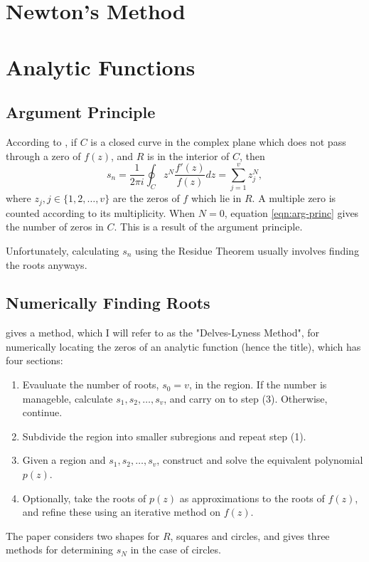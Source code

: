 \documentclass{article}
\begin{document}
\section{Newton's Method}

\section{Analytic Functions}

\subsection{Argument Principle}

According to \cite{delves1967numerical},
if $C$ is a closed curve in the complex plane which does not pass through a zero of $f(z)$, and $R$ is in the interior of $C$, 
then
\begin{equation}\label{eqn:arg-princ}
	s_n=\frac{1}{2\pi i}\oint_Cz^N\frac{f'(z)}{f(z)}dz=\sum_{j=1}^vz_j^N,
\end{equation}
where $z_j,j\in\{1,2,\dots,v\}$ are the zeros of $f$ which lie in $R$.
A multiple zero is counted according to its multiplicity.
When $N=0$, equation \ref{eqn:arg-princ} gives the number of zeros in $C$.
This is a result of the argument principle.\cite{wiki:argument-principle}

Unfortunately, calculating $s_n$ using the Residue Theorem usually involves finding the roots anyways.

\subsection{Numerically Finding Roots}

\cite{delves1967numerical} gives a method, which I will refer to as the "Delves-Lyness Method", for numerically locating the zeros of an analytic function (hence the title),
which has four sections:
\begin{enumerate}
	\item Evauluate the number of roots, $s_0=v$, in the region.
	If the number is manageble, calculate $s_1,s_2,\dots,s_v$, and carry on to step (3).
	Otherwise, continue.
	\item
	Subdivide the region into smaller subregions and repeat step (1).
	\item Given a region and $s_1,s_2,\dots,s_v$, construct and solve the equivalent polynomial $p(z)$.
	\item Optionally, take the roots of $p(z)$ as approximations to the roots of $f(z)$,
	and refine these using an iterative method on $f(z)$.
\end{enumerate}
The paper considers two shapes for $R$, squares and circles, 
and  gives three methods for determining $s_N$ in the case of circles.

\printbibliography
\end{document}
